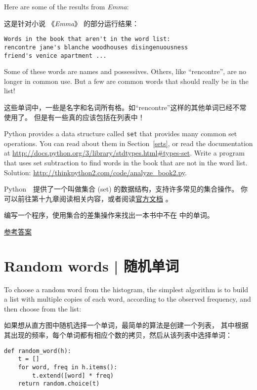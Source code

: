 %
Here are some of the results from {\em Emma}:

这是针对小说 《{\em Emma}》 的部分运行结果：

\begin{lstlisting}
Words in the book that aren't in the word list:
rencontre jane's blanche woodhouses disingenuousness
friend's venice apartment ...
\end{lstlisting}

%
Some of these words are names and possessives.  Others, like
``rencontre'', are no longer in common use.  But a few are common
words that should really be in the list!

这些单词中，一些是名字和名词所有格。如“rencontre”这样的其他单词已经不常使用了。
但是有一些真的应该包括在列表中！

\begin{exercise}
Python provides a data structure called {\tt set} that provides many
common set operations.  You can read about them in Section~\ref{sets},
or read the documentation at
\url{http://docs.python.org/3/library/stdtypes.html#types-set}.
Write a program that uses set subtraction to find words in the book
that are not in the word list.  Solution:
\url{http://thinkpython2.com/code/analyze_book2.py}.

Python　提供了一个叫做集合 (set) 的数据结构，支持许多常见的集合操作。
你可以前往第十九章阅读相关内容，或者阅读\href{http://docs.python.org/3/library/stdtypes.html#types-set}{官方文档} 。

编写一个程序，使用集合的差集操作来找出一本书中不在  中的单词。

\href{http://thinkpython2.com/code/analyze_book2.py}{参考答案}

\end{exercise}

\section{Random words  |  随机单词}
\label{randomwords}
To choose a random word from the histogram, the simplest algorithm
is to build a list with multiple copies of each word, according
to the observed frequency, and then choose from the list:

如果想从直方图中随机选择一个单词，最简单的算法是创建一个列表，
其中根据其出现的频率，每个单词都有相应个数的拷贝，然后从该列表中选择单词：

\begin{lstlisting}
def random_word(h):
    t = []
    for word, freq in h.items():
        t.extend([word] * freq)
    return random.choice(t)
\end{lstlisting}

